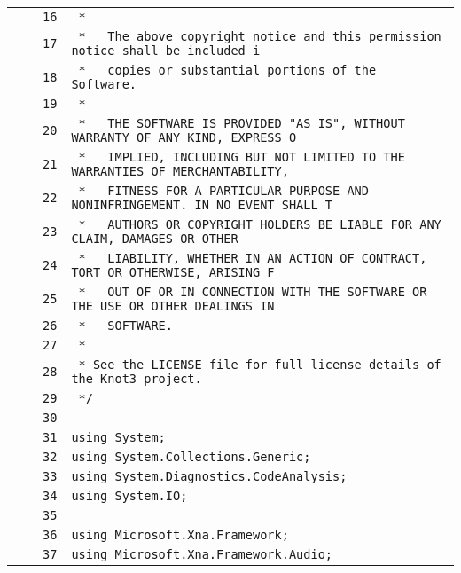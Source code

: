 \documentclass[a4paper,10pt]{article}
\begin{document}
\begin{longtable}[l]{lrrl}
\cellcolor{gray} &  & \verb~16~ & \verb~ *~\\
\cellcolor{gray} &  & \verb~17~ & \verb~ *   The above copyright notice and this permission notice shall be included i~\\
\cellcolor{gray} &  & \verb~18~ & \verb~ *   copies or substantial portions of the Software.~\\
\cellcolor{gray} &  & \verb~19~ & \verb~ *~\\
\cellcolor{gray} &  & \verb~20~ & \verb~ *   THE SOFTWARE IS PROVIDED "AS IS", WITHOUT WARRANTY OF ANY KIND, EXPRESS O~\\
\cellcolor{gray} &  & \verb~21~ & \verb~ *   IMPLIED, INCLUDING BUT NOT LIMITED TO THE WARRANTIES OF MERCHANTABILITY,~\\
\cellcolor{gray} &  & \verb~22~ & \verb~ *   FITNESS FOR A PARTICULAR PURPOSE AND NONINFRINGEMENT. IN NO EVENT SHALL T~\\
\cellcolor{gray} &  & \verb~23~ & \verb~ *   AUTHORS OR COPYRIGHT HOLDERS BE LIABLE FOR ANY CLAIM, DAMAGES OR OTHER~\\
\cellcolor{gray} &  & \verb~24~ & \verb~ *   LIABILITY, WHETHER IN AN ACTION OF CONTRACT, TORT OR OTHERWISE, ARISING F~\\
\cellcolor{gray} &  & \verb~25~ & \verb~ *   OUT OF OR IN CONNECTION WITH THE SOFTWARE OR THE USE OR OTHER DEALINGS IN~\\
\cellcolor{gray} &  & \verb~26~ & \verb~ *   SOFTWARE.~\\
\cellcolor{gray} &  & \verb~27~ & \verb~ *~\\
\cellcolor{gray} &  & \verb~28~ & \verb~ * See the LICENSE file for full license details of the Knot3 project.~\\
\cellcolor{gray} &  & \verb~29~ & \verb~ */~\\
\cellcolor{gray} &  & \verb~30~ & \verb~~\\
\cellcolor{gray} &  & \verb~31~ & \verb~using System;~\\
\cellcolor{gray} &  & \verb~32~ & \verb~using System.Collections.Generic;~\\
\cellcolor{gray} &  & \verb~33~ & \verb~using System.Diagnostics.CodeAnalysis;~\\
\cellcolor{gray} &  & \verb~34~ & \verb~using System.IO;~\\
\cellcolor{gray} &  & \verb~35~ & \verb~~\\
\cellcolor{gray} &  & \verb~36~ & \verb~using Microsoft.Xna.Framework;~\\
\cellcolor{gray} &  & \verb~37~ & \verb~using Microsoft.Xna.Framework.Audio;~\\

\end{longtable}
\end{document}
